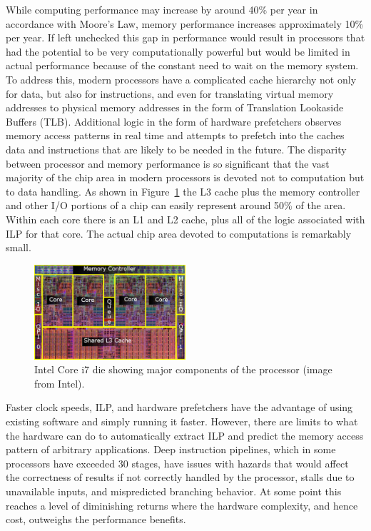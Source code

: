 \documentclass[preprint,sort&compress]{elsarticle}
\begin{document}
While computing performance may increase by around 40\% per year in accordance with Moore's Law, memory performance increases approximately 10\% per year.  If left unchecked this gap in performance would result in processors that had the potential to be very computationally powerful but would be limited in actual performance because of the constant need to wait on the memory system.  To address this, modern processors have a complicated cache hierarchy not only for data, but also for instructions, and even for translating virtual memory addresses to physical memory addresses in the form of Translation Lookaside Buffers (TLB).  Additional logic in the form of hardware prefetchers observes memory access patterns in real time and attempts to prefetch into the caches data and instructions that are likely to be needed in the future.  The disparity between processor and memory performance is so significant that the vast majority of the chip area in modern processors is devoted not to computation but to data handling.  As shown in Figure~\ref{fig:core_i7_die} the L3 cache plus the memory controller and other I/O portions of a chip can easily represent around 50\% of the area.  Within each core there is an L1 and L2 cache, plus all of the logic associated with ILP for that core.  The actual chip area devoted to computations is remarkably small.

\begin{figure}[!Hhtb]
\begin{center}
\includegraphics[width=0.5\textwidth]{Core_i7_die.pdf}
\caption{Intel Core i7 die showing major components of the processor (image from Intel). \label{fig:core_i7_die}}
\end{center}
\end{figure}

Faster clock speeds, ILP, and hardware prefetchers have the advantage of using existing software and simply running it faster.  However, there are limits to what the hardware can do to automatically extract ILP and predict the memory access pattern of arbitrary applications.  Deep instruction pipelines, which in some processors have exceeded 30 stages, have issues with hazards that would affect the correctness of results if not correctly handled by the processor, stalls due to unavailable inputs, and mispredicted branching behavior.  At some point this reaches a level of diminishing returns where the hardware complexity, and hence cost, outweighs the performance benefits.
\end{document}
